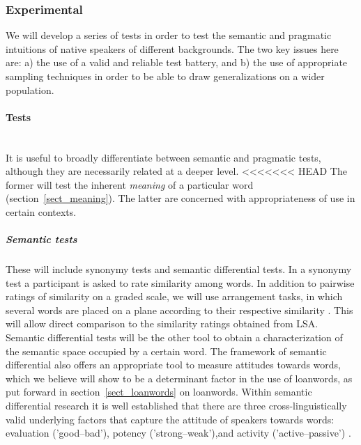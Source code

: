 \documentclass[a4paper]{article}
\begin{document}
\subsubsection{Experimental}
\label{subsect_experim}

We will develop a series of tests in order to test the semantic and pragmatic intuitions of native speakers of different backgrounds.
The two key issues here are: a) the use of a valid and reliable test battery, and b) the use of appropriate sampling techniques in order to be able to draw generalizations on a wider population.

\paragraph{Tests}
\hspace{0pt} \\
It is useful to broadly differentiate between semantic and pragmatic tests, although they are necessarily related at a deeper level.
<<<<<<< HEAD
The former will test the inherent \emph{meaning} of a particular word (section~\ref{sect_meaning}). 
The latter are concerned with appropriateness of use in certain contexts.

\subparagraph{Semantic tests}
These will include synonymy tests and semantic differential tests.
In a synonymy test a participant is asked to rate similarity among words.
In addition to pairwise ratings of similarity on a graded scale, we will use arrangement tasks, in which several words are placed on a plane according to their respective similarity \citep{Goldstone1994, Kriegeskorte2012}.
This will allow direct comparison to the similarity ratings obtained from LSA.
Semantic differential tests \citep{Osgood1957} will be the other tool to obtain a characterization of the semantic space occupied by a certain word.
The framework of semantic differential also offers an appropriate tool to measure attitudes towards words, which we believe will show to be a determinant factor in the use of loanwords, as put forward in section~\ref{sect_loanwords} on loanwords.
Within semantic differential research it is well established that there are three cross-linguistically valid underlying factors that capture the attitude of speakers towards words: evaluation ('good--bad'), potency ('strong--weak'),and activity ('active--passive') \citep[see][]{Heise2010}.
\end{document}
